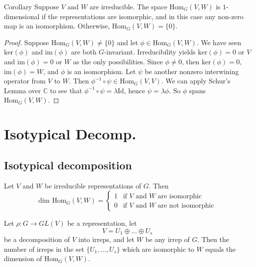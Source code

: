 \begin{frame}
\begin{block}{Corollary}
Suppose $V$ and $W$ are irreducible. The space $\text{Hom}_G(V,W)$ is $1$-dimensional if the representations are isomorphic, and in this case any non-zero map is an isomorphism. Otherwise,  $\text{Hom}_G(V,W)=\{0\}$.
\end{block}
\begin{proof}
Suppose  $\text{Hom}_G(V,W) \neq \{0\}$ and let $\phi \in \text{Hom}_G(V,W)$. We have seen $\text{ker}(\phi)$ and $\text{im}(\phi)$ are both $G$-invariant.
Irreducibility yields $\text{ker}(\phi) = 0$ or $V$ and $\text{im}(\phi) = 0$ or $W$ as the only possibilities.  Since $\phi \neq 0$, then $\text{ker}(\phi)=0$, $\text{im}(\phi)=W$, and $\phi$ is an isomorphism.  
Let $\psi$ be another nonzero interwining operator from $V$ to $W$.  Then $\phi ^{-1} \circ \psi \in \text{Hom}_G (V,V)$.  We can apply Schur's Lemma over $\mathbb{C}$ to see that $\phi ^{-1} \circ \psi = \lambda \text{Id}$, hence $\psi = \lambda \phi$.  So $\phi$ spans $\text{Hom}_G(V,W)$.
\end{proof}
\end{frame}

\section{Isotypical Decomp.}
\subsection{Isotypical decomposition}
\begin{frame}
\begin{proposition}
Let $V$ and $W$ be irreducible representations of $G$.  Then
\[ \text{dim Hom}_G (V,W) =  \begin{cases} 
1 & \mbox{if $V$ and $W$ are isomorphic}  \\
0 &\mbox{if $V$ and $W$ are not isomorphic}
\end{cases} \]
\end{proposition}
\end{frame}

\begin{frame}
\begin{proposition}
Let $\rho \colon G \to GL(V)$ be a representation, let \[ V = U_1 \oplus \ldots \oplus U_s \] be a decomposition of $V$ into irreps, and let $W$ be any irrep of $G$.  Then the number of irreps in the set  $ \{ U_1, \ldots, U_s \}$ which are isomorphic to $W$ equals the dimension of $\text{Hom}_G(V,W)$.
\end{proposition}
\end{frame}

